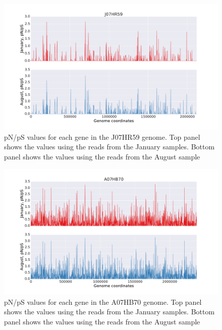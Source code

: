 \begin{figure}[p]
  \centering
  \includegraphics[width=\textwidth,height=\textheight,keepaspectratio]{Chapter5/Figures/pn_ps_plots/J07HR59_pNpS_density.pdf}
  \caption{pN/pS values for each gene in the J07HR59 genome. Top panel shows the values using the reads from the January samples. Bottom panel shows the values using the reads from the August sample}
  \label{J07HR59_pNpS}
\end{figure}

\begin{figure}[p]
  \centering
  \includegraphics[width=\textwidth,height=\textheight,keepaspectratio]{Chapter5/Figures/pn_ps_plots/A07HB70_pNpS_density.pdf}
  \caption{pN/pS values for each gene in the A07HB70 genome. Top panel shows the values using the reads from the January samples. Bottom panel shows the values using the reads from the August sample}
  \label{A07HB70_pNpS}
\end{figure}

